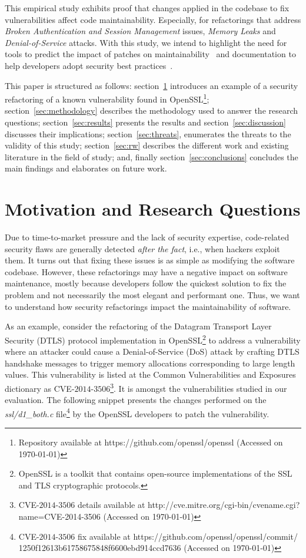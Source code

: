 \documentclass[10pt,conference]{IEEEtran}
\begin{document}
This empirical study exhibits proof that changes applied in the codebase to fix
vulnerabilities affect code maintainability. Especially, for refactorings that
address \emph{Broken Authentication and Session Management} issues, \emph{Memory
Leaks} and \emph{Denial-of-Service} attacks. With this study, we intend to highlight
the need for tools to predict the impact of patches on maintainability~\cite{4724577}
and documentation to help developers adopt security best practices~\cite{6311252,
7927935, MESQUIDA201519}.

This paper is structured as follows: section~\ref{sec:motivation} introduces an
example of a security refactoring of a known vulnerability found in
OpenSSL\footnote{Repository available at https://github.com/openssl/openssl
(Accessed on \today{})}; section~\ref{sec:methodology} describes the
methodology used to answer the research questions; section~\ref{sec:results}
presents the results and section~\ref{sec:discussion} discusses their
implications; section~\ref{sec:threats}, enumerates the threats to the validity of 
this study; section~\ref{sec:rw} describes the different work and existing
literature in the field of study; and, finally section~\ref{sec:conclusions}
concludes the main findings and elaborates on future work.
%
\section{Motivation and Research Questions}\label{sec:motivation}
%
Due to time-to-market pressure and the lack of security expertise, code-related
security flaws are generally detected \textit{after the fact}, i.e., when
hackers exploit them. It turns out that fixing these issues is as simple as
modifying the software codebase. However, these refactorings may have a negative
impact on software maintenance, mostly because developers follow the quickest
solution to fix the problem and not necessarily the most elegant and performant
one. Thus, we want to understand how security refactorings impact the
maintainability of software.

As an example, consider the refactoring of the Datagram Transport Layer Security
(DTLS) protocol implementation in OpenSSL\footnote{OpenSSL is a toolkit that
contains open-source implementations of the SSL and TLS cryptographic
protocols.} to address a vulnerability where an attacker could cause a Denial-of-Service
(DoS) attack by crafting DTLS handshake messages to trigger memory allocations
corresponding to large length values. This vulnerability is listed at the Common
Vulnerabilities and Exposures dictionary as CVE-$2014$-$3506$\footnote{CVE-$2014$-$3506$
details available at http://cve.mitre.org/cgi-bin/cvename.cgi?name=CVE-2014-3506
(Accessed on \today{})}. It is amongst the vulnerabilities studied in our
evaluation. The following snippet presents the changes performed on the
\emph{ssl/d1\_both.c} file\footnote{CVE-$2014$-$3506$ fix available  at
https://github.com/openssl/openssl/commit/\\1250f12613b61758675848f6600ebd914ccd7636
(Accessed on \today{})} by the OpenSSL developers to patch the vulnerability.
\end{document}
